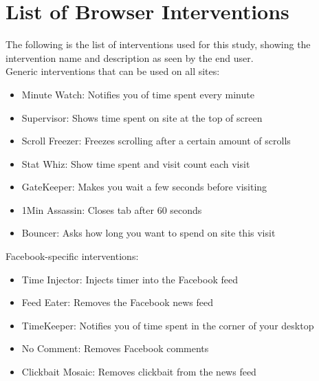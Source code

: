 \section{List of Browser Interventions}


The following is the list of interventions used for this study, showing the intervention name and description as seen by the end user.\\

Generic interventions that can be used on all sites:
\begin{small}
\begin{itemize}
    \item Minute Watch: Notifies you of time spent every minute
    \item Supervisor: Shows time spent on site at the top of screen
    \item Scroll Freezer: Freezes scrolling after a certain amount of scrolls
    \item Stat Whiz: Show time spent and visit count each visit
    \item GateKeeper: Makes you wait a few seconds before visiting
    \item 1Min Assassin: Closes tab after 60 seconds
    \item Bouncer: Asks how long you want to spend on site this visit
\end{itemize}
\end{small}
\vspace{2mm}

Facebook-specific interventions:

\begin{itemize}
    \item Time Injector: Injects timer into the Facebook feed
    \item Feed Eater: Removes the Facebook news feed
    \item TimeKeeper: Notifies you of time spent in the corner of your desktop
    \item No Comment: Removes Facebook comments
    \item Clickbait Mosaic: Removes clickbait from the news feed
\end{itemize}

\vspace{2mm}

